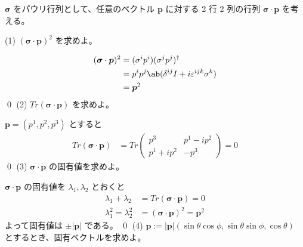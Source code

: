 \documentclass[uplatex,dvipdfmx,a4paper,11pt]{jlreq}
\makeatletter
\newcommand{\pp}{\bm{p}}
\numberwithin{equation}{section}
\theoremstyle{definition}
\renewenvironment{proof}[1][\proofname]{\par
  \normalfont
  \topsep6\p@\@plus6\p@ \trivlist
  \item[\hskip\labelsep{\bfseries #1}\@addpunct{\bfseries}]\ignorespaces\quad\par
}{%
  \qed\endtrivlist\@endpefalse
}
\renewcommand\proofname{証明}
\makeatother
\begin{document}
\begin{problem}
$\bm{\sigma}$ をパウリ行列として、任意のベクトル $\pp$ に対する 2 行 2 列の行列 $\bm{\sigma}\cdot\pp$ を考える。
\end{problem}
(1) $(\bm{\sigma}\cdot\pp)^2$ を求めよ。
\begin{proof}
  \begin{align}
    (\bm{\sigma}\cdot\pp)^2 & = (\sigma^ip^i)(\sigma^jp^j)^\dagger                   \\
                            & = p^ip^j\ab(\delta^{ij}I + i\varepsilon^{ijk}\sigma^k) \\
                            & = \pp^2
  \end{align}
\end{proof}
(2) $Tr(\bm{\sigma}\cdot\pp)$ を求めよ。
\begin{proof}
  $\pp = (p^1, p^2, p^3)$ とすると
  \begin{align}
    Tr(\bm{\sigma}\cdot\pp) & = Tr\begin{pmatrix}
                                    p^3        & p^1 - ip^2 \\
                                    p^1 + ip^2 & -p^3
                                  \end{pmatrix} = 0
  \end{align}
\end{proof}
(3) $\bm{\sigma}\cdot\pp$ の固有値を求めよ。
\begin{proof}
  $\bm{\sigma}\cdot\pp$ の固有値を $\lambda_1, \lambda_2$ とおくと
  \begin{align}
    \lambda_1 + \lambda_2     & = Tr(\bm{\sigma}\cdot\pp) = 0     \\
    \lambda_1^2 = \lambda_2^2 & = (\bm{\sigma}\cdot\pp)^2 = \pp^2
  \end{align}
  よって固有値は $\pm|\pp|$ である。
\end{proof}
(4) $\pp := |\pp|(\sin\theta\cos\phi, \sin\theta\sin\phi, \cos\theta)$ とするとき、固有ベクトルを求めよ。
\end{document}
